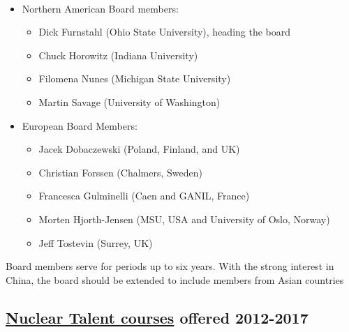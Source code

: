 \documentclass[%
oneside,                 %
final,                   %
10pt]{article}
\begin{document}
\paragraph{}
\begin{itemize}
\item Northern American Board members:
\begin{itemize}

  \item Dick Furnstahl (Ohio State University), heading the board

  \item Chuck Horowitz (Indiana University) 

  \item Filomena Nunes (Michigan State University) 

  \item Martin Savage (University of  Washington) 

\end{itemize}

\noindent
\item European Board Members:
\begin{itemize}

  \item Jacek Dobaczewski (Poland, Finland, and UK) 

  \item Christian Forssen (Chalmers, Sweden) 

  \item Francesca Gulminelli (Caen and GANIL, France) 

  \item Morten Hjorth-Jensen (MSU, USA and University of Oslo, Norway)

  \item Jeff Tostevin (Surrey, UK) 
\end{itemize}

\noindent
\end{itemize}

\noindent
Board members serve for periods up to six years. With the strong interest in China, the board should be extended to include members from Asian countries



\subsection*{\href{{http://fribtheoryalliance.org/TALENT/courses/courses.php}}{Nuclear Talent courses}  offered 2012-2017}
\end{document}

